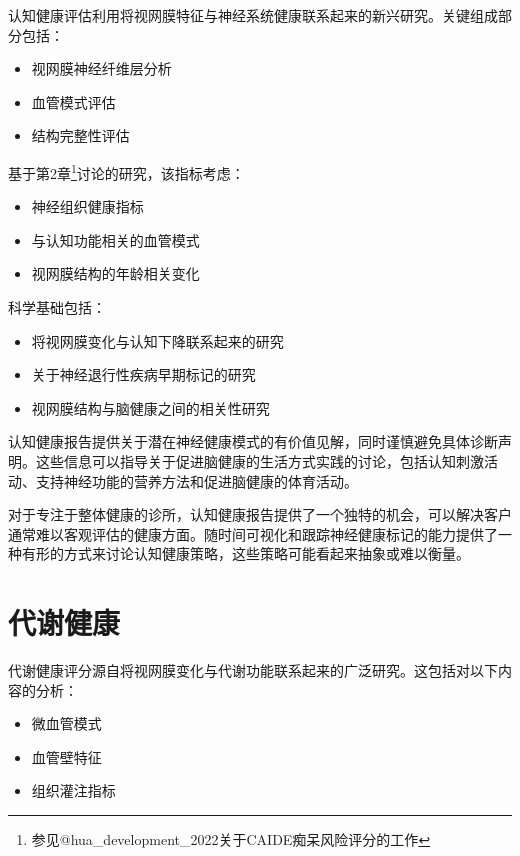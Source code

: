 \documentclass[
  Letterpaper,
]{scrbook}
\providecommand{\tightlist}{%
  \setlength{\itemsep}{0pt}\setlength{\parskip}{0pt}}\usepackage{longtable,booktabs,array}
\begin{document}
认知健康评估利用将视网膜特征与神经系统健康联系起来的新兴研究。关键组成部分包括：

\begin{itemize}
\tightlist
\item
  视网膜神经纤维层分析
\item
  血管模式评估
\item
  结构完整性评估
\end{itemize}

基于第2章\footnote{参见@hua\_development\_2022关于CAIDE痴呆风险评分的工作}讨论的研究，该指标考虑：

\begin{itemize}
\tightlist
\item
  神经组织健康指标
\item
  与认知功能相关的血管模式
\item
  视网膜结构的年龄相关变化
\end{itemize}

科学基础包括：

\begin{itemize}
\tightlist
\item
  将视网膜变化与认知下降联系起来的研究
\item
  关于神经退行性疾病早期标记的研究
\item
  视网膜结构与脑健康之间的相关性研究
\end{itemize}

认知健康报告提供关于潜在神经健康模式的有价值见解，同时谨慎避免具体诊断声明。这些信息可以指导关于促进脑健康的生活方式实践的讨论，包括认知刺激活动、支持神经功能的营养方法和促进脑健康的体育活动。

对于专注于整体健康的诊所，认知健康报告提供了一个独特的机会，可以解决客户通常难以客观评估的健康方面。随时间可视化和跟踪神经健康标记的能力提供了一种有形的方式来讨论认知健康策略，这些策略可能看起来抽象或难以衡量。

\section{代谢健康}\label{ux4ee3ux8c22ux5065ux5eb7}

代谢健康评分源自将视网膜变化与代谢功能联系起来的广泛研究。这包括对以下内容的分析：

\begin{itemize}
\tightlist
\item
  微血管模式
\item
  血管壁特征
\item
  组织灌注指标
\end{itemize}
\end{document}
